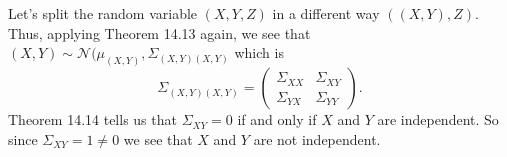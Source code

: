 
Let's split the random variable $ (X,Y,Z)$ in a different way $ ((X,Y),Z)$. Thus, applying Theorem
14.13 again, we see that $ (X,Y) \sim \mathcal N(\mu_{(X,Y)} , \Sigma_{(X,Y)(X,Y)} $ which is
\[
    \Sigma_{(X,Y)(X,Y)} = \begin{pmatrix}
	\Sigma_{XX} & \Sigma_{XY} \\
	\Sigma_{YX} & \Sigma_{YY} 
    \end{pmatrix}
.\] 
Theorem 14.14 tells us that $ \Sigma_{XY} = 0$ if and only if $ X$ and $ Y$ are independent. So
since $ \Sigma_{XY} = 1 \neq 0$ we see that $ X$ and $ Y$ are not independent.
